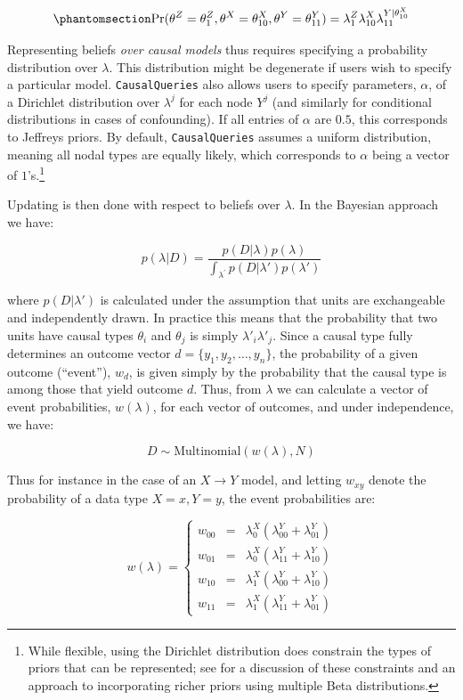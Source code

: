 \documentclass[
  11pt,
  article]{jss}
\begin{document}
\begin{equation}\phantomsection\label{eq-join2}{
\Pr(\theta^Z = \theta^Z_1, \theta^X = \theta^X_{10}, \theta^Y = \theta^Y_{11}) = 
\lambda^Z_1\lambda^X_{10}\lambda^{Y|\theta^X_{10}}_{11}
}\end{equation}

Representing beliefs \emph{over causal models} thus requires specifying
a probability distribution over \(\lambda\). This distribution might be
degenerate if users wish to specify a particular model.
\texttt{CausalQueries} also allows users to specify parameters,
\(\alpha\), of a Dirichlet distribution over \(\lambda^j\) for each node
\(Y^j\) (and similarly for conditional distributions in cases of
confounding). If all entries of \(\alpha\) are \(0.5\), this corresponds
to Jeffreys priors. By default, \texttt{CausalQueries} assumes a uniform
distribution, meaning all nodal types are equally likely, which
corresponds to \(\alpha\) being a vector of \(1\)'s.\footnote{While
  flexible, using the Dirichlet distribution does constrain the types of
  priors that can be represented; see \citet{irons2023causally} for a
  discussion of these constraints and an approach to incorporating
  richer priors using multiple Beta distributions.}

Updating is then done with respect to beliefs over \(\lambda\). In the
Bayesian approach we have:

\[
p(\lambda|D) = \frac{p(D|\lambda)p(\lambda)}{\int_{\lambda^{'}} p(D|\lambda')p(\lambda')}
\]

where \(p(D|\lambda')\) is calculated under the assumption that units
are exchangeable and independently drawn. In practice this means that
the probability that two units have causal types \(\theta_i\) and
\(\theta_j\) is simply \(\lambda'_i\lambda'_j\). Since a causal type
fully determines an outcome vector \(d = \{y_1, y_2,\dots,y_n\}\), the
probability of a given outcome (``event''), \(w_d\), is given simply by
the probability that the causal type is among those that yield outcome
\(d\). Thus, from \(\lambda\) we can calculate a vector of event
probabilities, \(w(\lambda)\), for each vector of outcomes, and under
independence, we have:

\[
D \sim \text{Multinomial}(w(\lambda), N)
\]

Thus for instance in the case of an \(X \rightarrow Y\) model, and
letting \(w_{xy}\) denote the probability of a data type \(X=x, Y=y\),
the event probabilities are:

\[
w(\lambda) = \left\{\begin{array}{ccc} w_{00} & = & \lambda^X_0(\lambda^Y_{00} + \lambda^Y_{01})\\ 
w_{01} & = & \lambda^X_0(\lambda^Y_{11} + \lambda^Y_{10})\\
w_{10} & = & \lambda^X_1(\lambda^Y_{00} + \lambda^Y_{10})\\
w_{11} & = & \lambda^X_1(\lambda^Y_{11} + \lambda^Y_{01})\end{array} \right.
\]
\end{document}
